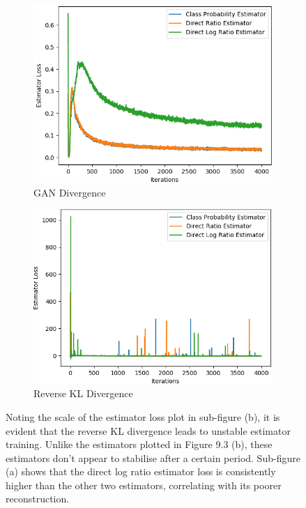 \documentclass[honours,12pt]{unswthesis}
\numberwithin{equation}{section}
\theoremstyle{definition}
\begin{document}
\begin{figure}[h!]
\centering
\begin{subfigure}{0.49\textwidth}
\includegraphics[width=\linewidth]{part3estimatorlosses/PCADVvsPCADVexpvsPCADVgudlog.png}
\caption{GAN Divergence}
\end{subfigure}
\begin{subfigure}{0.49\textwidth}
\includegraphics[width=\linewidth]{part3estimatorlosses/PCKLDvsPCKLexpvsPCKLgudlog.png}
\caption{Reverse KL Divergence}
\end{subfigure}
\caption{\small Noting the scale of the estimator loss plot in sub-figure (b), it is evident that the reverse KL divergence leads to unstable estimator training. Unlike the estimators plotted in Figure 9.3 (b), these estimators don't appear to stabilise after a certain period. Sub-figure (a) shows that the direct log ratio estimator loss is consistently higher than the other two estimators, correlating with its poorer reconstruction.}
\end{figure}
\end{document}
